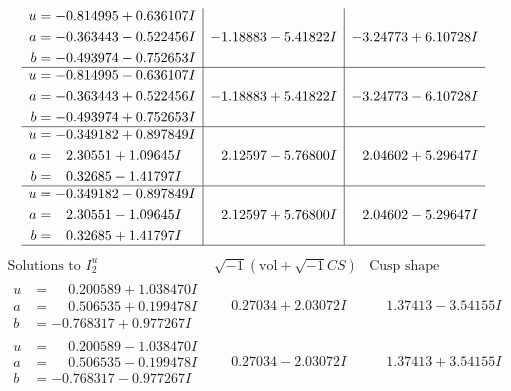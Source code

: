 \documentclass[1p]{elsarticle_modified}
\theoremstyle{definition}
\newcommand{\I}{\sqrt{-1}}
\begin{document}
$$\begin{array}{c|c|c}
\begin{aligned}
u &= -0.814995 + 0.636107 I \\
a &= -0.363443 - 0.522456 I \\
b &= -0.493974 - 0.752653 I\end{aligned}
 & -1.18883 - 5.41822 I & -3.24773 + 6.10728 I \\ \hline\begin{aligned}
u &= -0.814995 - 0.636107 I \\
a &= -0.363443 + 0.522456 I \\
b &= -0.493974 + 0.752653 I\end{aligned}
 & -1.18883 + 5.41822 I & -3.24773 - 6.10728 I \\ \hline\begin{aligned}
u &= -0.349182 + 0.897849 I \\
a &= \phantom{-}2.30551 + 1.09645 I \\
b &= \phantom{-}0.32685 - 1.41797 I\end{aligned}
 & \phantom{-}2.12597 - 5.76800 I & \phantom{-}2.04602 + 5.29647 I \\ \hline\begin{aligned}
u &= -0.349182 - 0.897849 I \\
a &= \phantom{-}2.30551 - 1.09645 I \\
b &= \phantom{-}0.32685 + 1.41797 I\end{aligned}
 & \phantom{-}2.12597 + 5.76800 I & \phantom{-}2.04602 - 5.29647 I\\
 \hline 
 \end{array}$$\newpage$$\begin{array}{c|c|c}  
\text{Solutions to }I^u_{2}& \I (\text{vol} + \sqrt{-1}CS) & \text{Cusp shape}\\
 \hline 
\begin{aligned}
u &= \phantom{-}0.200589 + 1.038470 I \\
a &= \phantom{-}0.506535 + 0.199478 I \\
b &= -0.768317 + 0.977267 I\end{aligned}
 & \phantom{-}0.27034 + 2.03072 I & \phantom{-}1.37413 - 3.54155 I \\ \hline\begin{aligned}
u &= \phantom{-}0.200589 - 1.038470 I \\
a &= \phantom{-}0.506535 - 0.199478 I \\
b &= -0.768317 - 0.977267 I\end{aligned}
 & \phantom{-}0.27034 - 2.03072 I & \phantom{-}1.37413 + 3.54155 I \\ \hline\begin{aligned}

\end{aligned}
\end{array}$$
\end{document}
